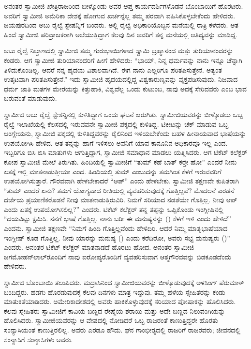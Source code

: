  ಅನಂತರ ಸ್ವಾಮೀಜಿ ಖೇತ್ರಿರಾಜರಿಂದ ಬೀಳ್ಕೊಂಡು ಅವರ ಆಪ್ತ ಕಾರ್ಯದರ್ಶಿಗಳೊಡನೆ ಬೊಂಬಾಯಿಗೆ ಹೊರಟರು. ಅವರಿಗೆ ಸ್ವಾಮೀಜಿ ಅಮೆರಿಕಾ ದೇಶಕ್ಕೆ ಹೋಗುವ ಖರ್ಚನ್ನೆಲ್ಲ ತಮ್ಮ ಪರವಾಗಿ ವಹಿಸಿಕೊಳ್ಳಬೇಕೆಂದು ಹೇಳಿದರು. ಜಯಪುರದಿಂದ ಅಬು ರೈಲ್ವೆ ಸ್ಟೇಷನ್ನಿಗೆ ಬಂದರು. ಅಲ್ಲಿ ರೈಲ್ವೆ ಅಧಿಕಾರಿಯೊಬ್ಬನ ಮನೆಯಲ್ಲಿ ರಾತ್ರಿ ಕಳೆದರು. ಆತ ಹಿಂದೆ ಸ್ವಾಮೀಜಿ ಪರಿವ್ರಾಜಕರಾಗಿ ಅಲೆಯುತ್ತಿದ್ದಾಗ ಕೆಲವು ದಿನ ಅವರಿಗೆ ತನ್ನ ಮನೆಯಲ್ಲಿ ಆತಿಥ್ಯವನ್ನು ಮಾಡಿದ್ದ. 

ಅಬು ರೈಲ್ವೆ ನಿಲ್ದಾಣದಲ್ಲಿ ಸ್ವಾಮೀಜಿ ತಮ್ಮ ಗುರುಭಾಯಿಗಳಾದ ಸ್ವಾಮಿ ಬ್ರಹ್ಮಾನಂದ ಮತ್ತು ತುರಿಯಾನಂದರನ್ನು ಕಂಡರು. ಆಗ ಸ್ವಾಮೀಜಿ ತುರಿಯಾನಂದರಿಗೆ ಹೀಗೆ ಹೇಳಿದರು: “ಭಾಯ್, ನಿನ್ನ ಧರ್ಮವನ್ನು ನಾನು ಇನ್ನೂ ಚೆನ್ನಾಗಿ ತಿಳಿದುಕೊಂಡಿಲ್ಲ. ಆದರೆ ನನ್ನ ಹೃದಯ ವಿಶಾಲವಾಗಿದೆ. ಈಗ ನಾನು ಎಲ್ಲರಿಗೂ ಪರಿತಪಿಸುತ್ತೇನೆ. ಅತ್ಯಂತ ಉತ್ಕಟವಾಗಿ ಪರಿತಪಿಸುತ್ತೇನೆ.” ಇದು ಸ್ವಾಮೀಜಿ ಹೃದಯದಲ್ಲಿದ್ದ ವಿಶ್ವಕಾರುಣ್ಯವನ್ನು ವ್ಯಕ್ತಪಡಿಸುವುದು. ನಿಜವಾದ ಧರ್ಮ ಜಾತಿ ಮತಗಳ ಮೇರೆಯನ್ನು ಕಿತ್ತುಹಾಕಿ, ವಿಶ್ವವೆಲ್ಲ ಒಂದು ಕುಟುಂಬ, ನಾವು ಅದಕ್ಕೆ ಸೇರಿದವರು ಎಂಬ ಭಾವ ಬರುವಂತೆ ಮಾಡುವುದು. 

 ಸ್ವಾಮೀಜಿ ಅಬು ರೈಲ್ವೆ ಸ್ಟೇಶನ್ನಿನಲ್ಲಿ ಕುಳಿತಿದ್ದಾಗ ಒಂದು ಘಟನೆ ಜರುಗಿತು. ಸ್ವಾಮೀಜಿಯವರನ್ನು ಬೀಳ್ಕೊಡಲು ಒಬ್ಬ ರೈಲ್ವೆ ಇಲಾಖೆಯಲ್ಲಿ ಕೆಲಸದಲ್ಲಿ ಇರುವವನೇ ಸ್ವಾಮೀಜಿ ಪಕ್ಕದಲ್ಲಿ ಕುಳಿತಿದ್ದ. ಟಿಕೀಟನ್ನು ಚೆಕ್ ಮಾಡುವ ಒಬ್ಬ ಆಂಗ್ಲೇಯನು, ಸ್ವಾಮೀಜಿ ಪಕ್ಕದಲ್ಲಿ ಕುಳಿತಿದ್ದವರನ್ನು ರೈಲಿನಿಂದ ಇಳಿಯಬೇಕೆಂದು ಬಹಳ ಹೀನಾಯವಾದ ಭಾಷೆಯನ್ನು ಉಪಯೋಗಿಸಿ ಹೇಳಿದ. ಆತ ತನ್ನನ್ನು ಹಾಗೆ ಇಳಿಸಲು ಅವನಿಗೆ ಯಾವ ಕಾನೂನಿನ ಅಧಿಕಾರವೂ ಇಲ್ಲ ಎಂದ. ಇಬ್ಬರಿಗೂ ಬಿಸಿ ಬಿಸಿ ಮಾತುಗಳು ಆಗುತ್ತಿದ್ದಾಗ, ಸ್ವಾಮೀಜಿ ಸಮಾಧಾನ ಮಾಡಲು ಯತ್ನಿಸಿದರು. ಆಗ ಟಿಕೆಟ್ ಕಲೆಕ್ಟರ್ ಕೋಪ ಸ್ವಾಮೀಜಿ ಮೇಲೆ ತಿರುಗಿತು. ಹಿಂದಿಯಲ್ಲಿ ಸ್ವಾಮೀಜಿಗೆ “ತುಮ್ ಕಹೆ ಬಾತ್ ಕರ್‍ತೇ‌ ಹೋ” ಎಂದರೆ ನೀನು ಏತಕ್ಕೆ ಇಲ್ಲಿ ಮಾತನಾಡುತ್ತೀಯಾ ಎಂದ. ಹಿಂದಿಯಲ್ಲಿ ತುಮ್ ಎಂಬುದನ್ನು ತಮಗಿಂತ ಕೆಳಗೆ ಇರುವವರಿಗೆ ಉಪಯೋಗಿಸುತ್ತಾರೆ. ಗೌರವವಾಗಿ ಹೇಳಬೇಕಾದರೆ “ಆಪ್” ಎಂದು ಹೇಳಬೇಕು. ಸ್ವಾಮೀಜಿ ತಕ್ಷಣವೇ ಕುಪಿತರಾಗಿ “ತುಮ್ ಎಂದರೆ ಏನು? ತಮಗೆ ಯೋಗ್ಯವಾದ ರೀತಿಯಲ್ಲಿ ವ್ಯವಹರಿಸುವುದಕ್ಕೆ ಗೊತ್ತಿಲ್ಲವೆ? ಮೊದಲನೆ ಎರಡನೆ ದರ್ಜೆಯ ಪ್ರಯಾಣಿಕರೊಡನೆ ನೀವು ಮಾತನಾಡುತ್ತಿರುವಿರಿ. ನಿಮಗೆ ಸರಿಯಾದ ನಡತೆಯೇ ಗೊತ್ತಿಲ್ಲ. ನೀವು ಆಪ್ ಎಂದು ಏತಕ್ಕೆ ಉಪಯೋಗಿಸಲಿಲ್ಲ?” ಎಂದರು. ಟಿಕೆಟ್ ಕಲೆಕ್ಟರ್ ತನ್ನ ತಪ್ಪನ್ನು ಒಪ್ಪಿಕೊಂಡು ಇಂಗ್ಲೀಷಿನಲ್ಲಿ “ದಯವಿಟ್ಟು ಕ್ಷಮಿಸಿ. ನನಗೆ ಭಾಷೆ ಗೊತ್ತಿಲ್ಲ. ನಾನು ಬರೀ ಈ ಮನುಷ್ಯನನ್ನು () ಕೆಳಗೆ ಇಳಿ ಎಂದು ಹೇಳಿದೆ” ಎಂದನು. ಸ್ವಾಮೀಜಿ ತಕ್ಷಣವೇ‌ “ನಿಮಗೆ ಹಿಂದಿ ಗೊತ್ತಿಲ್ಲವೆಂದು ಹೇಳಿದಿರಿ. ಆದರೆ ನಿಮ್ಮ ಮಾತೃಭಾಷೆಯಾದ ಇಂಗ್ಲೀಷ್ ಕೂಡ ಗೊತ್ತಿಲ್ಲ. ನೀವು ಯಾರನ್ನು ಮನುಷ್ಯ () ಎಂದು ಕರೆದಿರೋ, ಅವರು ಸಭ್ಯ ಮನುಷ್ಯರು ()” ಎಂದರು. ಅನಂತರ ಟಿಕೆಟ್ ಕಲೆಕ್ಟರ್ ಮಾತನಾಡದೆ ಹೊರಟು ಹೋದ. ಅನಂತರ ಸ್ವಾಮೀಜಿ ಜಗಮೋಹನ್‍ಲಾಲ್‍ರೊಂದಿಗೆ ನಾವು ಐರೋಪ್ಯರೊಂದಿಗೆ ವ್ಯವಹರಿಸುವಾಗ ಆತ್ಮಗೌರವವನ್ನು ಬಿಡಕೂಡದೆಂದು ಹೇಳಿದರು. 

 ಸ್ವಾಮೀಜಿ ಬೊಂಬಾಯಿ ತಲುಪಿದರು. ಮದ್ರಾಸಿನಿಂದ ಸ್ವಾಮೀಜಿಯವರನ್ನು ಬೀಳ್ಕೊಡುವುದಕ್ಕೆ ಅಳಸಿಂಗ್ ಪೆರುಮಾಳ್ ಬಂದಿದ್ದರು. ಹಡಗು ಹೊರಡುವುದಕ್ಕೆ ಕೆಲವು ದಿನಗಳು ಮಾತ್ರ ಇದ್ದುವು. ತಮ್ಮ ಹಳೆಯ ಸ್ನೇಹಿತರನ್ನು ಕಂಡು ಮಾತುಕತೆಯಾಡಿದರು. ಅಮೇರಿಕಾದೇಶದಲ್ಲಿ ಅವರು ಹಾಕಿಕೊಳ್ಳುವುದಕ್ಕೆ ಸರಿಯಾದ ಪೋಷಾಕನ್ನು ಹೊಲಿಸಿದರು. ಕೆಲವು ಸ್ನೇಹಿತರು ಸ್ವಾಮೀಜಿಗೆ ಕಾವಿಯ ಬಣ್ಣದ ರೇಷ್ಮೆಯ ಶರಾಯಿ ಮತ್ತು ಅದೇ ಬಣ್ಣದ ನಿಲುವಂಗಿಯನ್ನು ಹೊಲಿಸಿದರು. ಸ್ವಾಮೀಜಿಯವರನ್ನು ಆ ವೇಷದಲ್ಲಿ ನೋಡಿದರೆ ಒಬ್ಬ ರಾಜರಂತೆ ಕಾಣುತ್ತಿದ್ದರೇ ಹೊರತು ಸಂನ್ಯಾಸಿಯಂತೆ ಕಾಣುತ್ತಿರಲಿಲ್ಲ. ಅವರು ಎರಡೂ ಹೌದು. ಘನ ಗಾಂಭೀರ‍್ಯದಲ್ಲಿ ರಾಜರಿಗೆ ರಾಜರವರು; ಜೀವನದಲ್ಲಿ ಸಂನ್ಯಾಸಿಗೆ ಸಂನ್ಯಾಸಿಗಳು ಅವರು. 

